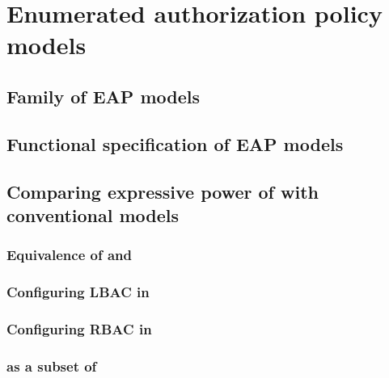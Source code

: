 \chapter{Enumerated authorization policy models}
\section{Family of EAP models}
	
\section{Functional specification of EAP models}
	
\section{Comparing expressive power of  \eapABAC{} with conventional models}
\subsection{Equivalence of \eapABAC{}  and \twoSortedRBAC{} }
	
\subsection{Configuring LBAC in \eapABAC{}}
	
\subsection{Configuring RBAC in \eapABAC{}}
	
\subsection{\eapABAC{} as a subset of \policyMachine{}}
	
